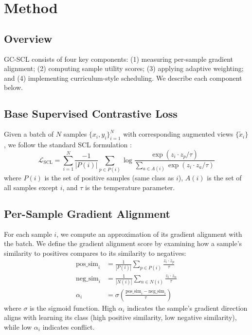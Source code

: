 \documentclass{article}
\begin{document}
\section{Method}

\subsection{Overview}

GC-SCL consists of four key components: (1) measuring per-sample gradient alignment; (2) computing sample utility scores; (3) applying adaptive weighting; and (4) implementing curriculum-style scheduling. We describe each component below.

\subsection{Base Supervised Contrastive Loss}

Given a batch of $N$ samples $\{x_i, y_i\}_{i=1}^N$ with corresponding augmented views $\{\tilde{x}_i\}$, we follow the standard SCL formulation \citep{khosla2020supervised}:
\begin{equation}
\mathcal{L}_{\text{SCL}} = \sum_{i=1}^N \frac{-1}{|P(i)|} \sum_{p \in P(i)} \log \frac{\exp(z_i \cdot z_p / \tau)}{\sum_{a \in A(i)} \exp(z_i \cdot z_a / \tau)}
\end{equation}
where $P(i)$ is the set of positive samples (same class as $i$), $A(i)$ is the set of all samples except $i$, and $\tau$ is the temperature parameter.

\subsection{Per-Sample Gradient Alignment}

For each sample $i$, we compute an approximation of its gradient alignment with the batch. We define the gradient alignment score by examining how a sample's similarity to positives compares to its similarity to negatives:
\begin{align}
\text{pos\_sim}_i &= \frac{1}{|P(i)|} \sum_{p \in P(i)} \frac{z_i \cdot z_p}{\tau} \\
\text{neg\_sim}_i &= \frac{1}{|N(i)|} \sum_{n \in N(i)} \frac{z_i \cdot z_n}{\tau} \\
\alpha_i &= \sigma\left(\frac{\text{pos\_sim}_i - \text{neg\_sim}_i}{\tau}\right)
\end{align}
where $\sigma$ is the sigmoid function. High $\alpha_i$ indicates the sample's gradient direction aligns with learning its class (high positive similarity, low negative similarity), while low $\alpha_i$ indicates conflict.
\end{document}
